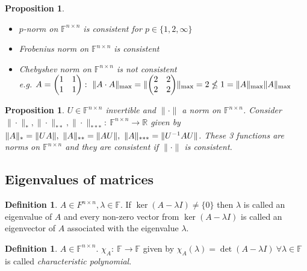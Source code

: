 \documentclass[12pt]{article}
\newtheorem{proposition}[theorem]{Proposition}
\theoremstyle{definition}
\newtheorem{definition}[theorem]{Definition}
\theoremstyle{remark}
\numberwithin{equation}{section}
\newcommand{\F}{\mathbb{F}}
\newcommand{\R}{\mathbb{R}}
\newcommand{\normempty}{\|\cdot\|}
\DeclarePairedDelimiter{\norm}{\lVert}{\rVert}
\begin{document}
\begin{proposition}~\\
  \begin{itemize}
    \item $p$-norm on $\F^{n \times n}$ is consistent for $p \in \{1, 2, \infty\}$
    \item Frobenius norm on $\F^{n \times n}$ is consistent
    \item Chebyshev norm on $\F^{n \times n}$ is \emph{not} consistent \\[0.5\baselineskip]
      e.g. $A =
      \begin{pmatrix} 1 & 1 \\ 1 & 1
      \end{pmatrix}:\ \norm{A\cdot A}_{\max} = \norm{
        \begin{pmatrix} 2 & 2 \\ 2 & 2
      \end{pmatrix}}_{\max} = 2 \nleq 1 = \norm{A}_{\max} \norm{A}_{\max}$
  \end{itemize}
\end{proposition}
\begin{proposition}
  \label{prop:consistent-norms}
  $U\in \F^{n \times n}$ invertible and $\normempty$ a norm on $\F^{n \times n}$. Consider $\normempty_*, \normempty_{**}, \normempty_{***}:\ \F^{n \times n} \rightarrow \R$ given by $\norm{A}_* = \norm{UA},\ \norm{A}_{**} = \norm{AU},\ \norm{A}_{***} = \norm{U^{-1}AU}$. These 3 functions are norms on $\F^{n \times n}$ and they are consistent if $\normempty$ is consistent.
\end{proposition}

\subsection{Eigenvalues of matrices}
\begin{definition}
  $A \in F^{n \times n}, \lambda \in \F$. If $\ker(A - \lambda I) \neq \{0\}$ then $\lambda$ is called an eigenvalue of $A$ and every non-zero vector from $\ker(A - \lambda I)$ is called an eigenvector of $A$ associated with the eigenvalue $\lambda$.
\end{definition}

\begin{definition}
  $A \in \F^{n \times n}$. $\chi_A:\ \F \rightarrow \F$ given by $\chi_A(\lambda) = \det(A - \lambda I)\ \forall \lambda \in \F $ is called \emph{characteristic polynomial}.
\end{definition}
\end{document}
